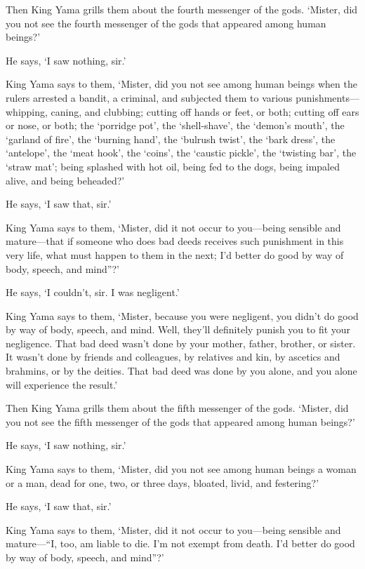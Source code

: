 \documentclass[12pt,openany]{book}%
\begin{document}
Then King Yama grills them about the fourth messenger of the gods. ‘Mister, did you not see the fourth messenger of the gods that appeared among human beings?’ 

He says, ‘I saw nothing, sir.’ 

King Yama says to them, ‘Mister, did you not see among human beings when the rulers arrested a bandit, a criminal, and subjected them to various punishments—whipping, caning, and clubbing; cutting off hands or feet, or both; cutting off ears or nose, or both; the ‘porridge pot’, the ‘shell-shave’, the ‘demon’s mouth’, the ‘garland of fire’, the ‘burning hand’, the ‘bulrush twist’, the ‘bark dress’, the ‘antelope’, the ‘meat hook’, the ‘coins’, the ‘caustic pickle’, the ‘twisting bar’, the ‘straw mat’; being splashed with hot oil, being fed to the dogs, being impaled alive, and being beheaded?’ 

He says, ‘I saw that, sir.’ 

King Yama says to them, ‘Mister, did it not occur to you—being sensible and mature—that if someone who does bad deeds receives such punishment in this very life, what must happen to them in the next; I’d better do good by way of body, speech, and mind”?’ 

He says, ‘I couldn’t, sir. I was negligent.’ 

King Yama says to them, ‘Mister, because you were negligent, you didn’t do good by way of body, speech, and mind. Well, they’ll definitely punish you to fit your negligence. That bad deed wasn’t done by your mother, father, brother, or sister. It wasn’t done by friends and colleagues, by relatives and kin, by ascetics and brahmins, or by the deities. That bad deed was done by you alone, and you alone will experience the result.’ 

Then King Yama grills them about the fifth messenger of the gods. ‘Mister, did you not see the fifth messenger of the gods that appeared among human beings?’ 

He says, ‘I saw nothing, sir.’ 

King Yama says to them, ‘Mister, did you not see among human beings a woman or a man, dead for one, two, or three days, bloated, livid, and festering?’ 

He says, ‘I saw that, sir.’ 

King Yama says to them, ‘Mister, did it not occur to you—being sensible and mature—“I, too, am liable to die. I’m not exempt from death. I’d better do good by way of body, speech, and mind”?’ 
\end{document}
